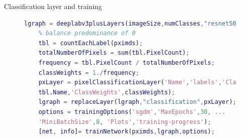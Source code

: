 \documentclass[aspectratio=169,xcolor=dvipsnames]{beamer}
\begin{document}
\begin{frame}[fragile]{Classification layer and training}
\begin{figure}
	\begin{minipage}{0.7\linewidth}
	\tiny{\begin{lstlisting}[language=Matlab,basicstyle=\tiny]
	lgraph = deeplabv3plusLayers(imageSize,numClasses,"resnet50"); 
	% balance predominance of 0
	tbl = countEachLabel(pximds);
	totalNumberOfPixels = sum(tbl.PixelCount);
	frequency = tbl.PixelCount / totalNumberOfPixels;
	classWeights = 1./frequency;
	pxLayer = pixelClassificationLayer('Name','labels','Classes',...
	tbl.Name,'ClassWeights',classWeights);
	lgraph = replaceLayer(lgraph,"classification",pxLayer);
	options = trainingOptions('sgdm','MaxEpochs',30, ...  
	'MiniBatchSize',8, 'Plots','training-progress');
	[net, info]= trainNetwork(pximds,lgraph,options);
\end{lstlisting}}
\centering
	\fontsize{3}{4}\vspace{2 mm}
	\fontsize{3}{4}
	\end{minipage}\hfill
\begin{minipage}{0.3\linewidth}

\end{minipage}
\end{figure}
\end{frame}
\end{document}
